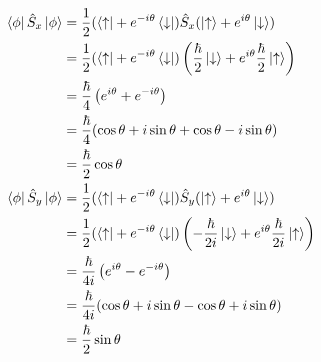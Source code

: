 \documentclass{article}
\begin{document}
\begin{align*}
\bra{\phi}\hat{S}_x\ket{\phi} 
&= \frac{1}{2}(\bra{\uparrow}+e^{-i\theta}\bra{\downarrow})\hat{S}_x(\ket{\uparrow}+e^{i\theta}\ket{\downarrow}) \\
&= \frac{1}{2}(\bra{\uparrow}+e^{-i\theta}\bra{\downarrow})\left(\frac{\hbar}{2}\ket{\downarrow}+e^{i\theta}\frac{\hbar}{2}\ket{\uparrow} \right) \\
&= \frac{\hbar}{4}\left(e^{i\theta}+e^{-i\theta} \right)\\ 
&= \frac{\hbar}{4}(\cos{\theta}+i\sin{\theta}+\cos{\theta}-i\sin{\theta}) \\
&= \frac{\hbar}{2}\cos{\theta} \\
\bra{\phi}\hat{S}_y\ket{\phi} 
&= \frac{1}{2}(\bra{\uparrow}+e^{-i\theta}\bra{\downarrow})\hat{S}_y(\ket{\uparrow}+e^{i\theta}\ket{\downarrow}) \\
&= \frac{1}{2}(\bra{\uparrow}+e^{-i\theta}\bra{\downarrow})\left(-\frac{\hbar}{2i}\ket{\downarrow}+e^{i\theta}\frac{\hbar}{2i}\ket{\uparrow} \right) \\
&= \frac{\hbar}{4i}\left(e^{i\theta}-e^{-i\theta} \right)\\ 
&= \frac{\hbar}{4i}(\cos{\theta}+i\sin{\theta}-\cos{\theta}+i\sin{\theta}) \\
&= \frac{\hbar}{2}\sin{\theta}
\end{align*}
\end{document}
